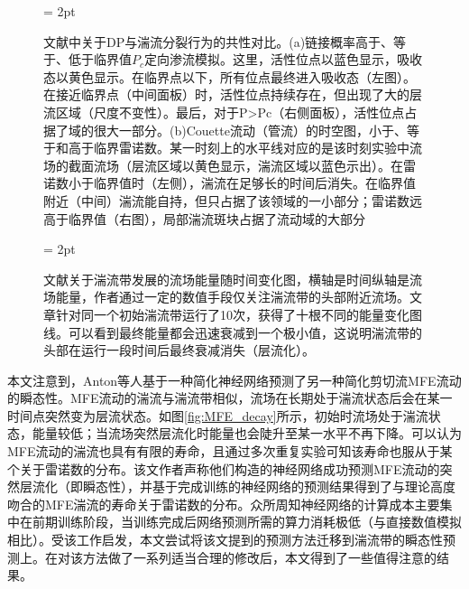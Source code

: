 \begin{figure}[htb]
	\subfigbottomskip = 2pt
	\begin{minipage}[h]{\linewidth}
	\centering
	\end{minipage}
	\quad
	\caption{文献\cite{Lemoult2016DirectedPP}中关于DP与湍流分裂行为的共性对比。(a)链接概率高于、等于、低于临界值$P_c$定向渗流模拟。这里，活性位点以蓝色显示，吸收态以黄色显示。在临界点以下，所有位点最终进入吸收态（左图）。在接近临界点（中间面板）时，活性位点持续存在，但出现了大的层流区域（尺度不变性）。最后，对于P>Pc（右侧面板），活性位点占据了域的很大一部分。(b)Couette流动（管流）的时空图，小于、等于和高于临界雷诺数。某一时刻上的水平线对应的是该时刻实验中流场的截面流场（层流区域以黄色显示，湍流区域以蓝色示出）。在雷诺数小于临界值时（左侧），湍流在足够长的时间后消失。在临界值附近（中间）湍流能自持，但只占据了该领域的一小部分；雷诺数远高于临界值（右图），局部湍流斑块占据了流动域的大部分}
\label{fig:DP}
\end{figure}

\begin{figure}[H]
	\subfigbottomskip = 2pt
	\begin{minipage}[h]{\linewidth}
	\centering
	\end{minipage}
	\quad
	\caption{文献\cite{xu_song_2022}关于湍流带发展的流场能量随时间变化图，横轴是时间纵轴是流场能量，作者通过一定的数值手段仅关注湍流带的头部附近流场。文章针对同一个初始湍流带运行了10次，获得了十根不同的能量变化图线。可以看到最终能量都会迅速衰减到一个极小值，这说明湍流带的头部在运行一段时间后最终衰减消失（层流化）。}
\label{fig:decay_KE}
\end{figure}

本文注意到，Anton等人基于一种简化神经网络预测了另一种简化剪切流MFE流动\cite{MFE}的瞬态性\cite{Anton2023}。MFE流动的湍流与湍流带相似，流场在长期处于湍流状态后会在某一时间点突然变为层流状态。如图\ref{fig:MFE_decay}所示，初始时流场处于湍流状态，能量较低；当流场突然层流化时能量也会陡升至某一水平不再下降。可以认为MFE流动的湍流也具有有限的寿命，且通过多次重复实验可知该寿命也服从于某个关于雷诺数的分布。该文作者声称他们构造的神经网络成功预测MFE流动的突然层流化（即瞬态性），并基于完成训练的神经网络的预测结果得到了与理论高度吻合的MFE湍流的寿命关于雷诺数的分布。众所周知神经网络的计算成本主要集中在前期训练阶段，当训练完成后网络预测所需的算力消耗极低（与直接数值模拟相比）。受该工作启发，本文尝试将该文提到的预测方法迁移到湍流带的瞬态性预测上。在对该方法做了一系列适当合理的修改后，本文得到了一些值得注意的结果。

